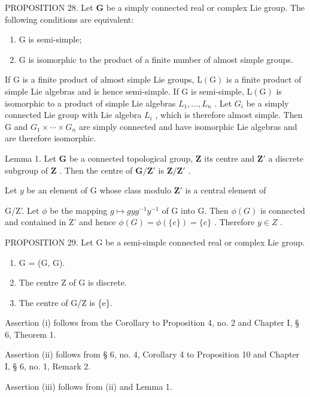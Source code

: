 PROPOSITION 28. Let \(\mathbf{G}\) be a simply connected real or complex Lie group. The following conditions are equivalent:

\begin{enumerate}
\def\labelenumi{(\roman{enumi})}
\item
  G is semi-simple;
\item
  G is isomorphic to the product of a finite number of almost simple groups.
\end{enumerate}

If G is a finite product of almost simple Lie groups, \(\mathrm{L}(\mathrm{G})\) is a finite product of simple Lie algebras and is hence semi-simple. If G is semi-simple, \(\mathrm{L}(\mathrm{G})\) is isomorphic to a product of simple Lie algebras \(L_{1},\ldots,L_{n}\) . Let \(G_{i}\) be a simply connected Lie group with Lie algebra \(L_{i}\) , which is therefore almost simple. Then G and \(G_{1}\times\cdots\times G_{n}\) are simply connected and have isomorphic Lie algebras and are therefore isomorphic.

Lemma 1. Let \(\mathbf{G}\) be a connected topological group, \(\mathbf{Z}\) its centre and \(\mathbf{Z}'\) a discrete subgroup of \(\mathbf{Z}\) . Then the centre of \(\mathbf{G}/\mathbf{Z}'\) is \(\mathbf{Z}/\mathbf{Z}'\) .

Let \(y\) be an element of G whose class modulo \(\mathbf{Z}'\) is a central element of

G/Z'. Let \(\phi\) be the mapping \(g \mapsto gyg^{-1}y^{-1}\) of G into G. Then \(\phi(G)\) is connected and contained in Z' and hence \(\phi(G) = \phi(\{e\}) = \{e\}\) . Therefore \(y \in Z\) .

PROPOSITION 29. Let G be a semi-simple connected real or complex Lie group.

\begin{enumerate}
\def\labelenumi{(\roman{enumi})}
\item
  G = (G, G).
\item
  The centre Z of G is discrete.
\item
  The centre of G/Z is \{e\}.
\end{enumerate}

Assertion (i) follows from the Corollary to Proposition 4, no. 2 and Chapter I, § 6, Theorem 1.

Assertion (ii) follows from § 6, no. 4, Corollary 4 to Proposition 10 and Chapter I, § 6, no. 1, Remark 2.

Assertion (iii) follows from (ii) and Lemma 1.

